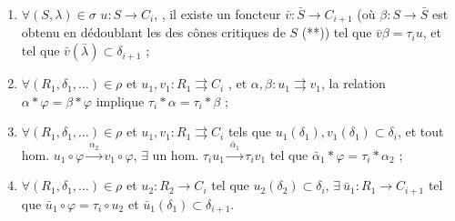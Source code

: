 \documentclass[11pt,a4paper]{article}
\begin{document}

\begin{enumerate}
  \item[d)] $\forall (S, \lambda) \in \sigma$  $u : S \to C_{i}$,
    , il existe
      un foncteur
    $\bar{v} : \bar{S} \to C_{i+1}$ (où $\beta : S \to \bar{S}$ est obtenu en
    dédoublant les \ill{}  des cônes critiques de $S$ (**)) tel
    que $\bar{v}\beta = \tau_{i} u$, et tel que $\bar{v}(\bar{\lambda}) \subset
    \delta_{i+1}$ ;
  \item[e$_{0}$)] $\forall (R_{1}, \delta_{1}, \ldots) \in \rho$ et
      $u_{1}, v_{1} : R_{1} \rightrightarrows C_{i}$ , et $\alpha, \beta : u_{1} \rightrightarrows v_{1}$, la
      relation $\alpha * \varphi = \beta * \varphi$ implique
      $\tau_{i} * \alpha = \tau_{i} * \beta$ ;
  \item[e$_{1}$)] $\forall (R_{1}, \delta_{1}, \ldots) \in \rho$ et
      $u_{1}, v_{1} : R_{1} \rightrightarrows C_{i}$ tels que
      $u_{1}(\delta_{1}), v_{1}(\delta_{1}) \subset \delta_{i}$, et tout hom.
      $u_{1} \circ \varphi \xrightarrow{\ \alpha_{2}\ } v_{1} \circ \varphi$,
      $\exists$ un hom. $\tau_{i} u_{1} \xrightarrow{\ \bar{\alpha}_{1}\ }
      \tau_{i} v_{1}$ tel que $\bar{\alpha}_{1} * \varphi = \tau_{i} *
      \alpha_{2}$ ;
  \item[e$_{2}$)] $\forall (R_{1}, \delta_{1}, \ldots) \in \rho$ et
      $u_{2} : R_{2} \to C_{i}$ tel que $u_{2}(\delta_{2}) \subset \delta_{i}$,
      $\exists\ \bar{u}_{1} : R_{1} \to C_{i+1}$ tel que $\bar{u}_{1} \circ
      \varphi = \tau_{i} \circ u_{2}$ et $\bar{u}_{1}(\delta_{1}) \subset
      \delta_{i+1}$.
\end{enumerate}
\end{document}
